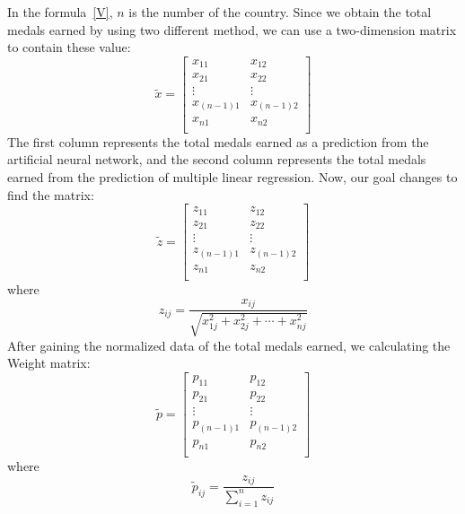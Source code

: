 \documentclass{mcmthesis}
\begin{document}
In the formula~\eqref{V}, $n$ is the number of the country. Since we obtain the total medals earned by using two different method, we can use a two-dimension matrix to contain these value:\\
\begin{equation}\label{eq:3}
\tilde{x}=
\begin{bmatrix}
	x_{11}&		x_{12}\\
	x_{21}&		x_{22}\\
	\vdots&		\vdots\\
	x_{(n-1)1}&		x_{(n-1)2}\\
	x_{n1}&		x_{n2}\\
\end{bmatrix}
\end{equation}
The first column represents the total medals earned as a prediction from the artificial neural network, and the second column represents the total medals earned from the prediction of multiple linear regression.
Now, our goal changes to find the matrix:
\begin{equation}\label{eq:3}
\tilde{z}=
\begin{bmatrix}
	z_{11}&		z_{12}\\
	z_{21}&		z_{22}\\
	\vdots&		\vdots\\
	z_{\left( n-1 \right) 1}&		z_{\left( n-1 \right) 2}\\
	z_{n1}&		z_{n2}\\
\end{bmatrix}
\end{equation}
where
\begin{equation}\label{eq:1}
z_{ij}=\frac{x_{ij}}{\sqrt{x_{1j}^{2}+x_{2j}^{2}+\cdots+x_{nj}^{2}}}
\end{equation}
After gaining the normalized data of the total medals earned, we calculating the Weight matrix:
\begin{equation}\label{eq:3}
\tilde{p}= 
\begin{bmatrix}
	p_{11}&		p_{12}\\
	p_{21}&		p_{22}\\
	\vdots&		\vdots\\
	p_{(n-1) 1}&		p_{\left( n-1 \right) 2}\\
	p_{n1}&		p_{n2}\\
\end{bmatrix}
\end{equation}
where
\begin{equation}\label{eq:1}
\tilde{p}_{ij}=\frac{z_{ij}}{\sum_{i=1}^n z_{ij}}
\end{equation}
\end{document}
